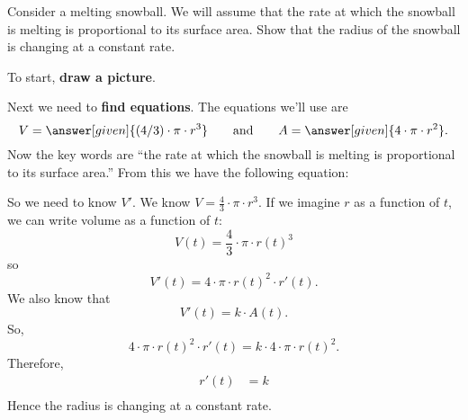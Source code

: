 \documentclass{ximera}
\begin{document}
\begin{example}
  Consider a melting snowball. We will assume that the rate at which the
  snowball is melting is proportional to its surface area. Show that
  the radius of the snowball is changing at a constant rate.
  
\begin{explanation}
  To start, \textbf{draw a picture}.
  \begin{image}
  \end{image}
  Next we need to \textbf{find equations}. The equations we'll use are
  \[
  V = \answer[given]{(4/3) \cdot \pi \cdot r^3} \qquad\text{and}\qquad A = \answer[given]{4\cdot
  \pi \cdot r^2}.
  \]
  Now the key words are ``the rate at which the snowball is melting is
  proportional to its surface area.'' From this we have the following
  equation:
  \begin{image}
  \end{image}
  So we need to know $V'$. We know $V = \frac{4}{3}\cdot \pi\cdot
  r^3$. If we imagine $r$ as a function of $t$, we can write volume as
  a function of $t$:
  \[
  V(t) = \frac{4}{3}\cdot \pi\cdot r(t)^3
  \]
  so
  \[
  V'(t) = 4\cdot \pi\cdot r(t)^2 \cdot r'(t).
  \]
  We also know that
   \[
  V'(t) = k\cdot A(t).
  \]
  So,
  \[
 4\cdot \pi \cdot r(t)^2 \cdot r'(t) =  k\cdot 4\cdot
  \pi \cdot r(t)^2 .
  \]
 Therefore,
  \begin{align*}
r'(t) &=  k\\
  \end{align*}
  Hence the radius is changing at a constant rate. 
\end{explanation}
\end{example}
\end{document}
